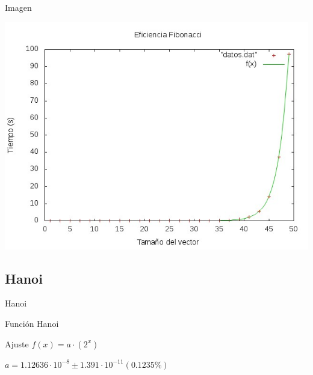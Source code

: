 \documentclass[compress]{beamer}
\begin{document}
\begin{frame}
	\begin{alertblock}{Imagen}
	\begin{center}
	\includegraphics[scale=0.55]{../Graficas/Fibonacci/fibonacciO0_ruben.jpeg}
	\end{center}
	\end{alertblock}
\end{frame}



\subsection{Hanoi}
\begin{frame}{Hanoi}
	\begin{block}{Función}
		Hanoi
	\end{block}
	
	\begin{block}{Ajuste}
	$f(x) = a\cdot(2^x) $
	
	$a               = 1.12636\cdot 10^{-8}      \pm 1.391\cdot 10^{-11}    (0.1235\%)$
	\end{block}
\end{frame}
\end{document}
